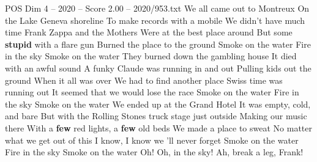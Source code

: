 \begin{textsample}{POS Dim 4 – 2020 – Score 2.00 – 2020/953.txt}  \label{ex:f4_pos_029}
We all came out to Montreux On the Lake Geneva shoreline To make records with a mobile We didn't have much time Frank Zappa and the Mothers Were at the best place around But some \textbf{stupid} with a flare gun Burned the place to the ground Smoke on the water Fire in the sky Smoke on the water They burned down the gambling house It died with an awful sound A funky Claude was running in and out Pulling kids out the ground When it all was over We had to find another place Swiss time was running out It seemed that we would lose the race Smoke on the water Fire in the sky Smoke on the water We ended up at the Grand Hotel It was empty, cold, and bare But with the Rolling Stones truck stage just outside Making our music there With a \textbf{few} red lights, a \textbf{few} old beds We made a place to sweat No matter what we get out of this I know, I know we 'll never forget Smoke on the water Fire in the sky Smoke on the water Oh!
Oh, in the sky!
Ah, break a leg, Frank!

\end{textsample}
